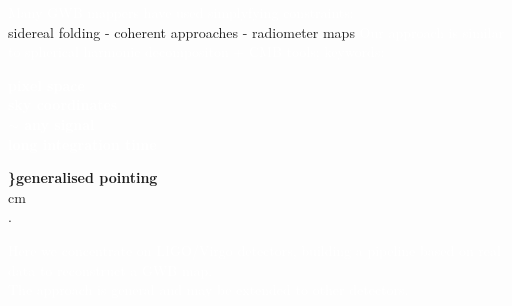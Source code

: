 \documentclass[handout]{beamer}
\begin{document}
\begin{frame}[plain]
\textcolor{white}{Many GWB mappers have used simplyfying constraints:}\\
\centering
\medskip
\textcolor{textcol2}{sidereal folding       -       coherent approaches       -        radiometer maps}
\flushleft
\medskip
\textcolor{white}{Our approach is similar to \textcolor{textcol2}{spherical harmonic decompositon} + \textcolor{textcol2}{CMB tools}; keywords:}
\medskip

\begin{minipage}{0.3\textwidth}
\hfill
\vskip 1.5cm 
\end{minipage}
\begin{minipage}{0.35\textwidth}
\centering
\textcolor{white}{
\textbf{pixel space} \\
 \textbf{sky coordinates}\\
  \textbf{$\sim$ any signal}\\
  \textbf{long integration time}
  }
  \end{minipage}
\begin{minipage}{0.3\textwidth}
\flushleft
\footnotesize
\textcolor{textcol}{ \bf \bf{\Big\}}generalised pointing}\\
\normalsize
{} cm
\textcolor{blue!50!black}{\\.}
\end{minipage}
\flushleft
\medskip
\textcolor{white}{Here we concentrate on LIGO/Virgo detectors, building a pipeline based on real data to reconstruct a GWB  map.}\\
\bigskip
\textcolor{white}{The approach is general and may be extended to other detectors.}\\
\smallskip

\end{frame}
\end{document}
